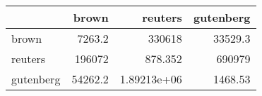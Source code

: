 \begin{tabular}{lrrr}
\hline
           &    brown &          reuters &   gutenberg \\
\hline
 brown     &   7263.2 & 330618           &    33529.3  \\
 reuters   & 196072   &    878.352       &   690979    \\
 gutenberg &  54262.2 &      1.89213e+06 &     1468.53 \\
\hline
\end{tabular}